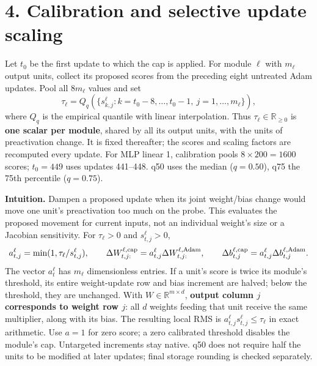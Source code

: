 \documentclass[11pt,a4paper]{article}
\newcommand{\R}{\mathbb R}
\newcommand{\sect}[1]{\vspace{2pt}\section*{#1}\vspace{-4pt}}
\begin{document}
\newpage
\sect{4. Calibration and selective update scaling}
Let $t_0$ be the first update to which the cap is applied. For module $\ell$
with $m_\ell$ output units, collect its proposed scores from the preceding eight
untreated Adam updates. Pool all $8m_\ell$ values and set
\begin{equation}
 \tau_\ell=Q_q\!\left(\{s_{k,j}^\ell:
 k=t_0-8,\ldots,t_0-1,\ j=1,\ldots,m_\ell\}\right),
 \label{eq:calibration}
\end{equation}
where $Q_q$ is the empirical quantile with linear interpolation. Thus
$\tau_\ell\in\R_{\geq0}$ is \textbf{one scalar per module}, shared by all its
output units, with the units of preactivation change. It is fixed thereafter;
the scores and scaling factors are recomputed every update. For MLP linear 1,
calibration pools $8\times200=1600$ scores; $t_0=449$ uses updates 441--448.
q50 uses the median ($q=0.50$), q75 the 75th percentile ($q=0.75$).

\textbf{Intuition.} Dampen a proposed update when its joint weight/bias change
would move one unit's preactivation too much on the probe. This evaluates the
proposed movement for current inputs, not an individual weight's size or a
Jacobian sensitivity. For $\tau_\ell>0$ and $s_{t,j}^\ell>0$,
\begin{equation}
 a_{t,j}^\ell=\min(1,\tau_\ell/s_{t,j}^\ell),\qquad
 \Delta W_{t,j:}^{\ell,\rm cap}=a_{t,j}^\ell\Delta W_{t,j:}^{\ell,\rm Adam},\qquad
 \Delta b_{t,j}^{\ell,\rm cap}=a_{t,j}^\ell\Delta b_{t,j}^{\ell,\rm Adam}.
 \label{eq:cap}
\end{equation}
The vector $a_t^\ell$ has $m_\ell$ dimensionless entries. If a unit's score is
twice its module's threshold, its entire weight-update row and bias increment
are halved; below the threshold, they are unchanged. With $W\in\R^{m\times d}$,
\textbf{output column $j$ corresponds to weight row $j$}: all $d$ weights
feeding that unit receive the same multiplier, along with its bias.
The resulting local RMS is $a_{t,j}^\ell s_{t,j}^\ell\leq\tau_\ell$ in exact
arithmetic. Use $a=1$ for zero score; a zero calibrated threshold disables the
module's cap. Untargeted increments stay native. q50 does not require half the
units to be modified at later updates; final storage rounding is checked separately.
\end{document}
